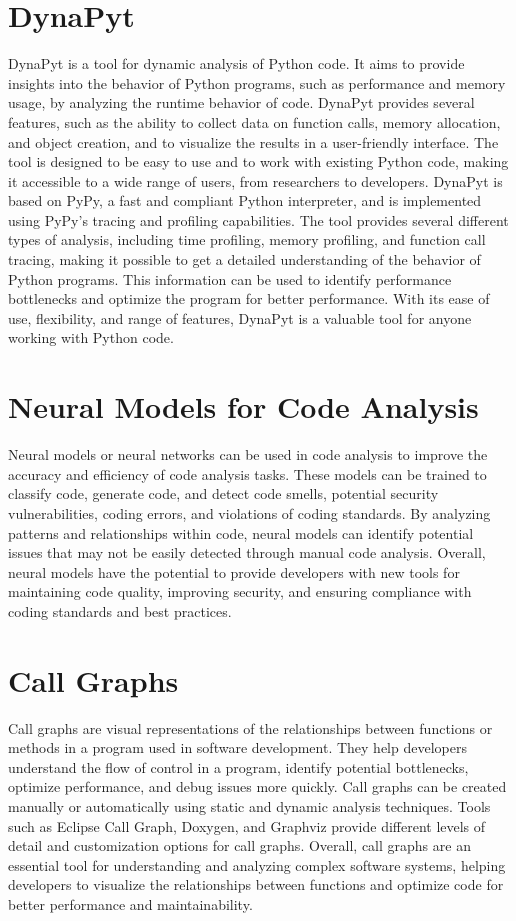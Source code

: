 \section{DynaPyt}
DynaPyt is a tool for dynamic analysis of Python code.
It aims to provide insights into the behavior of Python programs, such as performance and memory usage, by analyzing the runtime behavior of code.
DynaPyt provides several features, such as the ability to collect data on function calls, memory allocation, and object creation, and to visualize the results in a user-friendly interface.
The tool is designed to be easy to use and to work with existing Python code, making it accessible to a wide range of users, from researchers to developers.
DynaPyt is based on PyPy, a fast and compliant Python interpreter, and is implemented using PyPy's tracing and profiling capabilities.
The tool provides several different types of analysis, including time profiling, memory profiling, and function call tracing, making it possible to get a detailed understanding of the behavior of Python programs.
This information can be used to identify performance bottlenecks and optimize the program for better performance.
With its ease of use, flexibility, and range of features, DynaPyt is a valuable tool for anyone working with Python code.

\section{Neural Models for Code Analysis}
Neural models or neural networks can be used in code analysis to improve the accuracy and efficiency of code analysis tasks.
These models can be trained to classify code, generate code, and detect code smells, potential security vulnerabilities, coding errors, and violations of coding standards.
By analyzing patterns and relationships within code, neural models can identify potential issues that may not be easily detected through manual code analysis.
Overall, neural models have the potential to provide developers with new tools for maintaining code quality, improving security, and ensuring compliance with coding standards and best practices.

\section{Call Graphs}
Call graphs are visual representations of the relationships between functions or methods in a program used in software development.
They help developers understand the flow of control in a program, identify potential bottlenecks, optimize performance, and debug issues more quickly.
Call graphs can be created manually or automatically using static and dynamic analysis techniques.
Tools such as Eclipse Call Graph, Doxygen, and Graphviz provide different levels of detail and customization options for call graphs.
Overall, call graphs are an essential tool for understanding and analyzing complex software systems, helping developers to visualize the relationships between functions and optimize code for better performance and maintainability.